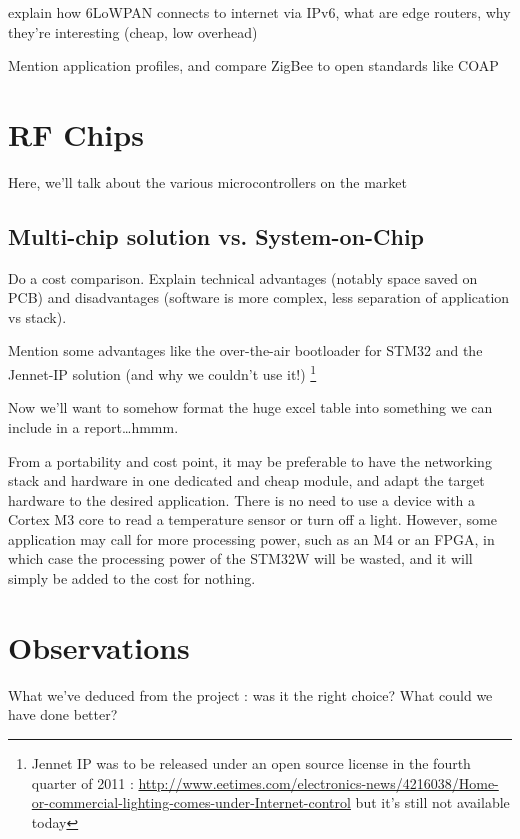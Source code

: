 explain how 6LoWPAN\citep{shelby2010} connects to internet via IPv6, what are
edge routers, why they're interesting (cheap, low overhead)

Mention application profiles, and compare ZigBee to open standards like COAP


\section{RF Chips}\label{sec:chips}

Here, we'll talk about the various microcontrollers on the market

\subsection{Multi-chip solution vs. System-on-Chip}

Do a cost comparison. 
Explain technical advantages (notably space saved on PCB) and disadvantages
(software is more complex, less separation of application vs stack).

Mention some advantages like the over-the-air bootloader for STM32 and the
Jennet-IP solution (and why we couldn't use it!) \footnote{Jennet IP was to be
released under an open source license in the fourth quarter of 2011
: \url{http://www.eetimes.com/electronics-news/4216038/Home-or-commercial-lighting-comes-under-Internet-control}
but it's still not available today}

Now we'll want to somehow format the huge excel table into something we can
include in a report\ldots hmmm.


From a portability and cost point, it may be preferable to have the networking
stack and hardware in one dedicated and cheap module, and adapt the target
hardware to the desired application. There is no need to use a device with
a Cortex M3 core to read a temperature sensor or turn off a light. However, some
application may call for more processing power, such as an M4 or an FPGA, in
which case the processing power of the STM32W will be wasted, and it will simply
be added to the cost for nothing.

\section{Observations}

What we've deduced from the project : was it the right choice? What could we
have done better?

